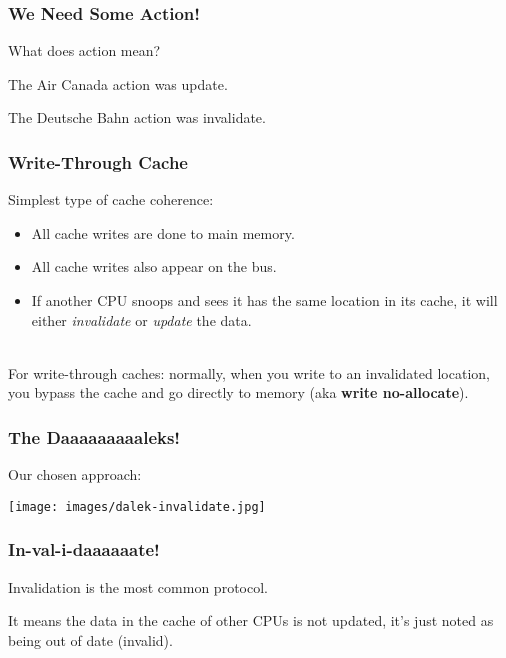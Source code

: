 \begin{frame}
\frametitle{We Need Some Action!}

What does action mean?

The Air Canada action was \alert{update}.

The Deutsche Bahn action was \alert{invalidate}.

\end{frame}


\begin{frame}
  \frametitle{Write-Through Cache}

  
Simplest type of cache coherence:
  \begin{itemize}
    \item All cache writes are done to main memory.
    \item All cache writes also appear on the bus.
    \item If another CPU snoops and sees it has the same location in
      its cache, it will either {\it invalidate} or {\it update} the
      data.
\end{itemize}
~\\

    For write-through caches: normally, when you write to an invalidated
    location, you bypass the cache and go directly to memory (aka {\bf
      write no-allocate}).

  
\end{frame}


\begin{frame}
\frametitle{The Daaaaaaaaaleks!}

Our chosen approach:

\begin{center}
\texttt{[image: images/dalek-invalidate.jpg]}
\end{center}

\end{frame}



\begin{frame}
\frametitle{In-val-i-daaaaaate!}

Invalidation is the most common protocol. 

It means the data in the cache of other CPUs is not updated, it's just noted as being out of date (invalid).  

\end{frame}


